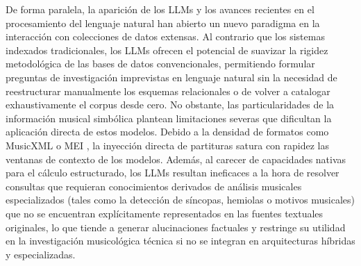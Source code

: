 De forma paralela, la aparición de los LLMs y los avances recientes en el procesamiento del lenguaje natural han abierto un nuevo paradigma en la interacción con colecciones de datos extensas. Al contrario que los sistemas indexados tradicionales, los LLMs ofrecen el potencial de suavizar la rigidez metodológica de las bases de datos convencionales, permitiendo formular preguntas de investigación imprevistas en lenguaje natural sin la necesidad de reestructurar manualmente los esquemas relacionales o de volver a catalogar exhaustivamente el corpus desde cero. No obstante, las particularidades de la información musical simbólica plantean limitaciones severas que dificultan la aplicación directa de estos modelos. Debido a la densidad de formatos como MusicXML \citep{good2001musicxml} o MEI \citep{roland2002music}, la inyección directa de partituras satura con rapidez las ventanas de contexto de los modelos. Además, al carecer de capacidades nativas para el cálculo estructurado, los LLMs resultan ineficaces a la hora de resolver consultas que requieran conocimientos derivados de análisis musicales especializados (tales como la detección de síncopas, hemiolas o motivos musicales) que no se encuentran explícitamente representados en las fuentes textuales originales, lo que tiende a generar alucinaciones factuales y restringe su utilidad en la investigación musicológica técnica si no se integran en arquitecturas híbridas y especializadas.

